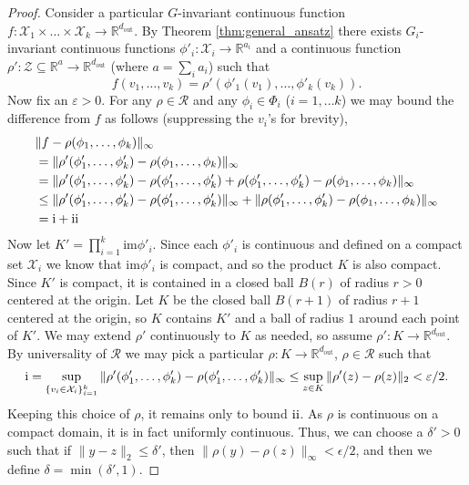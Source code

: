 \documentclass{article} \usepackage{iclr2023_conference,times}
\newcommand{\RR}{\mathbb R}
\newcommand{\mc}[1]{\mathcal{#1}}
\newcommand{\mrm}[1]{\mathrm{#1}}
\newcommand\norm[1]{\lVert#1\rVert}
\newcommand{\RN}[1]{\textup{\uppercase\expandafter{\romannumeral#1}}}
\newcommand{\dout}{d_{\mrm{out}}}
\begin{document}
\begin{proof}
Consider a particular $G$-invariant continuous function $f : \mc X_1 \times \ldots \times \mc X_k \to \RR^{\dout}$. By Theorem \ref{thm:general_ansatz}  there exists  $G_i$-invariant  continuous functions $\phi'_i : \mc X_i \to \RR^{a_i}$ and a continuous function $\rho': \mc Z \subseteq \RR^{a} \to \RR^{\dout}$ (where $a = \sum_i a_i$) such that
    \begin{equation*}
        f(v_1, \ldots, v_k) = \rho'( \phi'_1(v_1), \ldots,  \phi'_k(v_k) ).
    \end{equation*} 
Now fix an $\varepsilon > 0$. For any $\rho \in \mc R$ and any  $\phi_i \in \Phi_i$ ($i=1, \ldots k$) we may bound the difference from $f$ as follows (suppressing the $v_i$'s for brevity),
\begin{align*}
    & \| f  - \rho( \phi_1, \ldots,  \phi_k ) \|_\infty\\
    &=  \| \rho'( \phi'_1, \ldots,  \phi'_k )  - \rho( \phi_1, \ldots,  \phi_k ) \|_\infty \\
    &= \| \rho'( \phi'_1, \ldots,  \phi'_k ) - \rho( \phi'_1, \ldots,  \phi'_k ) + \rho( \phi'_1, \ldots,  \phi'_k )  - \rho( \phi_1, \ldots,  \phi_k ) \|_\infty \\
     &\leq \|\rho'( \phi'_1, \ldots,  \phi'_k ) - \rho( \phi'_1, \ldots,  \phi'_k ) \|_\infty+ \| \rho( \phi'_1, \ldots,  \phi'_k )  - \rho( \phi_1, \ldots,  \phi_k ) \|_\infty \\
     &= \RN{1}+\RN{2}
\end{align*}
Now let $K' = \prod_{i=1}^k \text{im} \phi'_i$. Since each $\phi'_i$ is continuous and defined on a compact set $\mc X_i$ we know that $\text{im} \phi'_i$ is compact, and so the product $K$ is also compact. Since $K'$ is compact, it is contained in a closed ball $B(r)$ of radius $r > 0$ centered at the origin. Let $K$ be the closed ball $B(r+1)$ of radius $r+1$ centered at the origin, so $K$ contains $K'$ and a ball of radius $1$ around each point of $K'$. We may extend $\rho'$ continuously to $K$ as needed, so assume $\rho': K \to \RR^{\dout}$. By universality of $\mc R$ we may pick a particular $\rho: K \to \RR^{\dout}$, $\rho \in \mc R$ such that 
\begin{equation*}
   \RN{1} =  \sup_{\{v_i \in \mc X_i\}_{i=1}^k} \|  \rho'( \phi'_1, \ldots,  \phi'_k ) - \rho( \phi'_1, \ldots,  \phi'_k ) \|_\infty \leq \sup_{z \in K} \| \rho'(z) - \rho(z) \|_2 < \varepsilon / 2.
\end{equation*}
Keeping this choice of $\rho$, it remains only to bound $\RN{2}$. As $\rho$ is continuous on a compact domain, it is in fact uniformly continuous. Thus, we can choose a $\delta' > 0$ such that if $\norm{y-z}_2 \leq \delta'$, then $\norm{\rho(y) - \rho(z)}_\infty < \epsilon / 2$, and then we define $\delta = \min(\delta', 1)$.



\end{proof}
\end{document}

